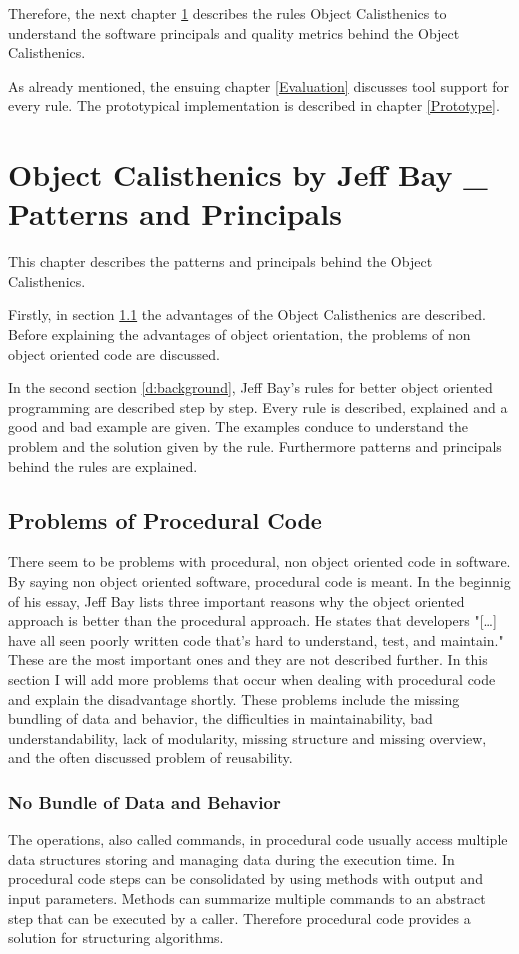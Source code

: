 Therefore, the next chapter  \ref{Description} describes the rules Object Calisthenics to understand the software principals and quality metrics behind the Object Calisthenics. 

As already mentioned, the ensuing chapter \ref{Evaluation} discusses tool support for every rule.  The prototypical implementation is described in chapter \ref{Prototype}.

\chapter{Object Calisthenics by Jeff Bay \_ Patterns and Principals}
\label{Description}
This chapter describes the patterns and principals behind the Object Calisthenics. 

Firstly, in section \ref{d:problemsprocedural} the advantages of the Object Calisthenics are described. Before explaining the advantages of object orientation, the problems of non object oriented code are discussed. 

In the second section \ref{d:background}, Jeff Bay's rules for better object oriented programming are described step by step. Every rule is described, explained and a good and bad example are given. The examples conduce to understand the problem and the solution given by the rule. Furthermore patterns and principals behind the rules are explained. 

\section{Problems of Procedural Code}
\label{d:problemsprocedural}
There seem to be problems with procedural, non object oriented code in software. By saying non object oriented software, procedural code is meant. In the beginnig of his essay, Jeff Bay lists three important reasons why the object oriented approach is better than the procedural approach. He states that developers "[\dots] have all seen poorly written code that's hard to understand, test, and maintain." \cite[p. 70]{oc2008} These are the most important ones and they are not described further. In this section I will add more problems that occur when dealing with procedural code and explain the disadvantage shortly. These problems include the missing bundling of data and behavior, the difficulties in maintainability, bad understandability, lack of modularity, missing structure and missing overview, and the often discussed problem of reusability.

\subsection*{No Bundle of Data and Behavior}
The operations, also called commands, in procedural code usually access multiple data structures storing and managing data during the execution time. In procedural code steps can be consolidated by using methods with output and input parameters. Methods can summarize multiple commands to an abstract step that can be executed by a caller. Therefore procedural code provides a solution for structuring algorithms.\\

